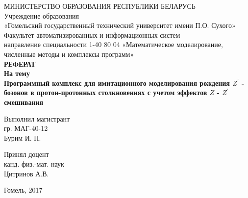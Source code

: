 \begin{titlepage}
	\large
	\begin{center}
		\vspace{3mm}
		МИНИСТЕРСТВО ОБРАЗОВАНИЯ РЕСПУБЛИКИ БЕЛАРУСЬ\\
		Учреждение образования\\
		«Гомельский государственный технический университет имени П.О. Сухого»\\
		Факультет автоматизированных и информационных систем\\
		направление специальности 1-40 80 04 «Математическое моделирование, численные методы и комплексы программ»\\
		\vspace{5mm}
		\textbf{РЕФЕРАТ\\}
		\vspace{5mm} \textbf{ На тему\\
			Программный комплекс для имитационного моделирования рождения $Z^\prime$ - бозонов в протон-протонных столкновениях с учетом эффектов $Z$ - $Z^\prime$ смешивания
		}
	\end{center}
	\vspace{30mm}
	\begin{flushleft}
		\hspace{8cm} Выполнил магистрант\\
		\hspace{8cm} гр. МАГ-40-12\\
		\hspace{8cm} Бурим И. П.\\
	\end{flushleft}
	\begin{flushleft}
		\hspace{8cm} Принял доцент\\
		\hspace{8cm} канд. физ.-мат. наук\\
		\hspace{8cm} Цитринов А.В.\\
	\end{flushleft}
	\begin{center}
		\vfill
		Гомель, 2017
	\end{center}
\end{titlepage}
